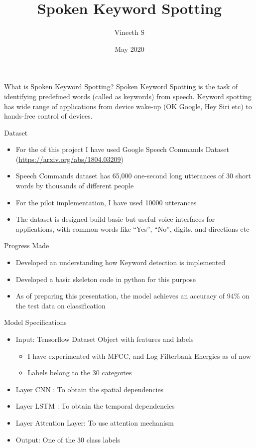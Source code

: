 \documentclass{beamer}
\title{Spoken Keyword Spotting}
\author{Vineeth S}
\date{May 2020}
\begin{document}
\maketitle

\begin{frame}{What is Spoken Keyword Spotting?}
	Spoken Keyword Spotting is the task of identifying predefined words (called as keywords) from speech. Keyword spotting has wide range of applications from device wake-up (OK Google, Hey Siri etc) to hands-free control of devices.
\end{frame}

\begin{frame}{Dataset}
	\begin{itemize}
		\item For the of this project I have used Google Speech Commands Dataset (\url{https://arxiv.org/abs/1804.03209})
		\item Speech Commands dataset has 65,000 one-second long utterances of 30 short words by thousands of different people
		\item For the pilot implementation, I have used 10000 utterances
		\item The dataset is designed build basic but useful voice interfaces for applications, with common words like “Yes”, “No”, digits, and directions etc
	\end{itemize}
\end{frame}

\begin{frame}{Progress Made}
	\begin{itemize}
	    \item Developed an understanding how Keyword detection is implemented
	    \item Developed a basic skeleton code in python for this purpose
	    \item As of preparing this presentation, the model achieves an accuracy of 94\% on the test data on classification
	\end{itemize}
\end{frame}

\begin{frame}{Model Specifications}
   \begin{itemize}
	    \item Input: Tensorflow Dataset Object with features and labels
		\begin{itemize}
			\item I have experimented with MFCC, and Log Filterbank Energies as of now
			\item Labels belong to the 30 categories
		\end{itemize}
		\item Layer CNN	: To obtain the spatial dependencies
	    \item Layer LSTM : To obtain the temporal dependencies
	    \item Layer Attention Layer: To use attention mechanism
	    \item Output: One of the 30 class labels
\end{itemize}
\end{frame}
\end{document}
